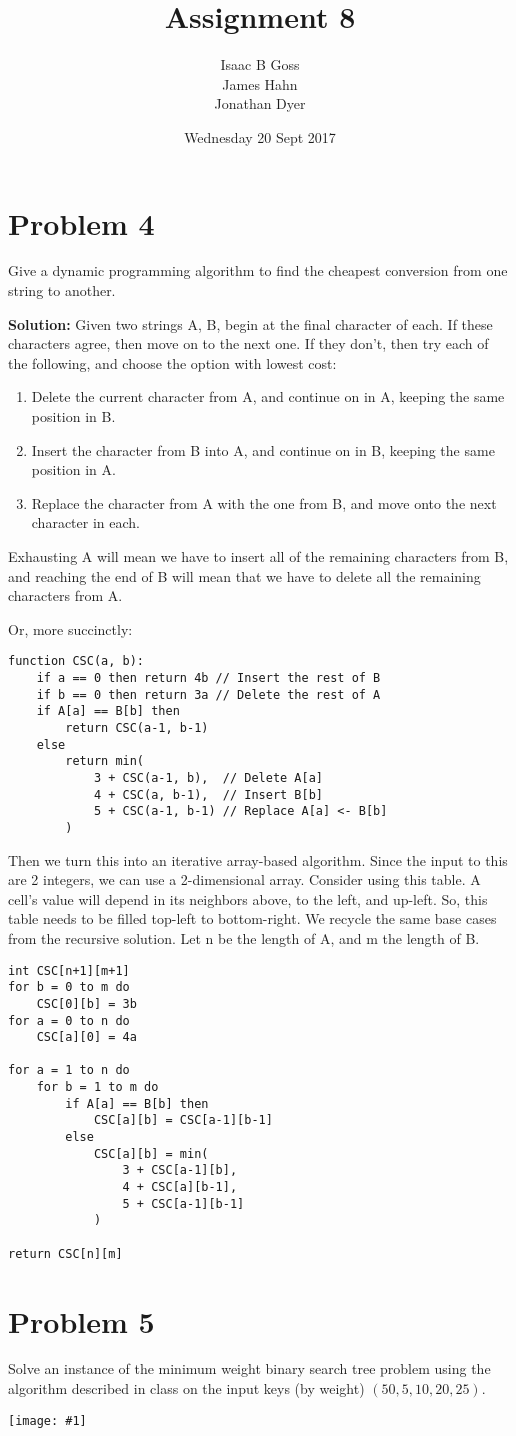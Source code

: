 \documentclass{article}
\author{Isaac B Goss\\ James Hahn\\ Jonathan Dyer}
\title{Assignment 8}
\date{Wednesday 20 Sept 2017}
\providecommand{\prob}[1]{\section*{Problem #1}}
\providecommand{\soln}{\textbf{Solution: }}
\providecommand{\image}[1]{
    \begin{center}
        \texttt{[image: \#1]}
    \end{center}
}
\providecommand{\tightlist}{
    \setlength{\itemsep}{0pt}\setlength{\parskip}{0pt}
}
\begin{document}
\maketitle

    \prob{4}
    Give a dynamic programming algorithm to find the cheapest conversion from one string to another.

    \soln Given two strings A, B, begin at the final character of each.
    If these characters agree, then move on to the next one.
    If they don't, then try each of the following, and choose the option with lowest cost:
    \begin{enumerate}\tightlist
        \item Delete the current character from A, and continue on in A, keeping the same position in B.
        \item Insert the character from B into A, and continue on in B, keeping the same position in A.
        \item Replace the character from A with the one from B, and move onto the next character in each.
    \end{enumerate}

    Exhausting A will mean we have to insert all of the remaining characters from B, and reaching the end of B will mean that we have to delete all the remaining characters from A.

    Or, more succinctly:

    \begin{lstlisting}
function CSC(a, b):
    if a == 0 then return 4b // Insert the rest of B
    if b == 0 then return 3a // Delete the rest of A
    if A[a] == B[b] then
        return CSC(a-1, b-1)
    else
        return min(
            3 + CSC(a-1, b),  // Delete A[a]
            4 + CSC(a, b-1),  // Insert B[b]
            5 + CSC(a-1, b-1) // Replace A[a] <- B[b]
        )
    \end{lstlisting}

    Then we turn this into an iterative array-based algorithm.
    Since the input to this are 2 integers, we can use a 2-dimensional array.
    Consider using this table.
    A cell's value will depend in its neighbors above, to the left, and up-left.
    So, this table needs to be filled top-left to bottom-right.
    We recycle the same base cases from the recursive solution.
    Let n be the length of A, and m the length of B.

    \begin{lstlisting}
int CSC[n+1][m+1]
for b = 0 to m do
    CSC[0][b] = 3b
for a = 0 to n do
    CSC[a][0] = 4a

for a = 1 to n do
    for b = 1 to m do
        if A[a] == B[b] then
            CSC[a][b] = CSC[a-1][b-1]
        else
            CSC[a][b] = min(
                3 + CSC[a-1][b],
                4 + CSC[a][b-1],
                5 + CSC[a-1][b-1]
            )

return CSC[n][m]
    \end{lstlisting}

    \prob{5}
    Solve an instance of the minimum weight binary search tree problem using the algorithm described in class on the input keys (by weight) $(50, 5, 10, 20, 25)$.

    \image{jpic}
\end{document}
